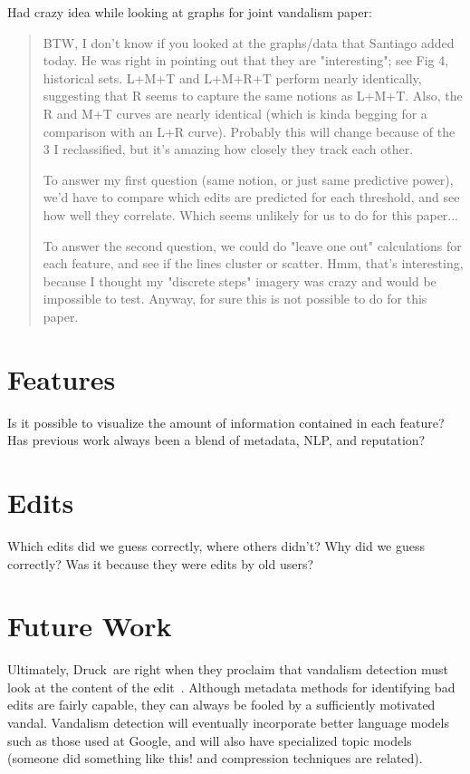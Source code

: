 Had crazy idea while looking at graphs for joint vandalism paper:
\begin{quote}
BTW, I don't know if you looked at the graphs/data that Santiago added today.  He was right in pointing out that they are "interesting"; see Fig 4, historical sets.  L+M+T and L+M+R+T perform nearly identically, suggesting that R seems to capture the same notions as L+M+T.  Also, the R and M+T curves are nearly identical (which is kinda begging for a comparison with an L+R curve).  Probably this will change because of the 3 I reclassified, but it's amazing how closely they track each other.

To answer my first question (same notion, or just same predictive power), we'd have to compare which edits are predicted for each threshold, and see how well they correlate.  Which seems unlikely for us to do for this paper...

To answer the second question, we could do "leave one out" calculations for each feature, and see if the lines cluster or scatter.  Hmm, that's interesting, because I thought my "discrete steps" imagery was crazy and would be impossible to test.  Anyway, for sure this is not possible to do for this paper.
\end{quote}


    \section{Features}
        Is it possible to visualize the amount of information
        contained in each feature?
        Has previous work always been a blend of metadata, NLP,
        and reputation?
    \section{Edits}
        Which edits did we guess correctly, where others didn't?
        Why did we guess correctly?  Was it because they were edits
        by old users?

    \section{Future Work}
        Ultimately, Druck~\etal are right when they proclaim that
        vandalism detection must look at the content of the
        edit~\cite{Druck2008}.
        Although metadata methods for identifying bad edits are
        fairly capable, they can always be fooled by a sufficiently
        motivated vandal.
        Vandalism detection will eventually incorporate better
        language models such as those used at Google,
        and will also have specialized topic models (someone did
        something like this!  and compression techniques are
        related).


